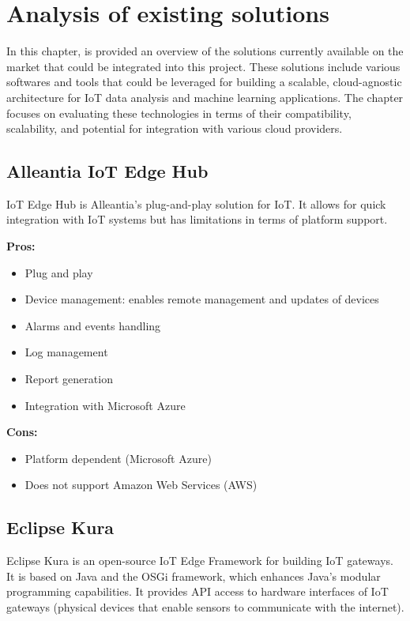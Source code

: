 \chapter{Analysis of existing solutions}
\label{cap:existing}
In this chapter, is provided an overview of the solutions currently available on the market that could be integrated into this project. These solutions include various softwares and tools that could be leveraged for building a scalable, cloud-agnostic architecture for IoT data analysis and machine learning applications. The chapter focuses on evaluating these technologies in terms of their compatibility, scalability, and potential for integration with various cloud providers.


\section{Alleantia IoT Edge Hub}
\label{alleantia}
IoT Edge Hub is Alleantia's\cite{site:alleantia} plug-and-play solution for IoT. It allows for quick integration with IoT systems but has limitations in terms of platform support.

\textbf{Pros:}
\begin{itemize}
    \item Plug and play
    \item Device management: enables remote management and updates of devices
    \item Alarms and events handling
    \item Log management
    \item Report generation
    \item Integration with Microsoft Azure
\end{itemize}

\textbf{Cons:}
\begin{itemize}
    \item Platform dependent (Microsoft Azure)
    \item Does not support Amazon Web Services (AWS)
\end{itemize}

\section{Eclipse Kura}
\label{kura}
Eclipse Kura\cite{site:kura} is an open-source IoT Edge Framework for building IoT gateways. It is based on Java and the OSGi\cite{site:osgi} framework, which enhances Java’s modular programming capabilities. It provides API access to hardware interfaces of IoT gateways (physical devices that enable sensors to communicate with the internet).

